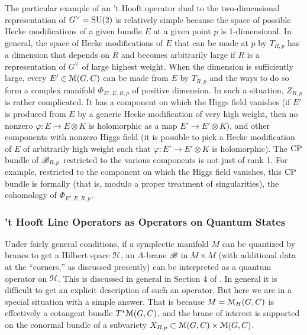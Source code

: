 \documentclass[11pt,a4paper]{article}
\begin{document}
 The particular example of an 't Hooft operator dual to  the two-dimensional representation of $G^\vee={\mathrm{SU}}(2)$ is relatively simple because the space
 of possible Hecke modifications of a given bundle $E$ at a given point $p$ is 1-dimensional.   In general, the space of Hecke modifications of $E$ that
 can be made at $p$ by $T_{R,p}$ has a dimension that depends on $R$ and becomes arbitrarily large if $R$ is a representation of $G^\vee$ of large highest weight.
 When the dimension is sufficiently large, every $E'\in {\mathcal M}(G,C)$ can be made from $E$ by $T_{R,p}$ and the ways to do so form a complex manifold $\Phi_{E',E,R,p}$
 of positive dimension.
 In such a situation, $Z_{R,p}$ is rather complicated.   It has a component on which the Higgs field vanishes (if $E'$ is produced from $E$ by a generic
 Hecke modification of very high weight, then no nonzero $\varphi:E\to E\otimes K$ is holomorphic as a map $E'\to E'\otimes K$), and other
 components with nonzero Higgs field (it is possible to pick a Hecke modification of $E$ of arbitrarily high weight 
 such that $\varphi:E'\to E'\otimes K$ is holomorphic). 
The ${\mathrm{CP}}$ bundle of ${\mathscr B}_{R,p}$ restricted to the various components is not just of rank 1.   For example, restricted to the component on which the
Higgs field vanishes, this ${\mathrm{CP}}$ bundle is formally  (that is,  modulo a proper treatment of singularities), the cohomology of $\Phi_{E',E,R,p}$.
 
\subsubsection{'t Hooft Line Operators as Operators on Quantum States}\label{lineq} 
   
 Under fairly general conditions, if a symplectic manifold $M$ can be quantized by branes to get a Hilbert space ${\mathcal H}$, an $A$-brane ${\mathscr B}$ in $M\times M$ (with
 additional data at the ``corners,'' as discussed presently) can be interpreted
 as a quantum operator on ${\mathcal H}$.  This is discussed in general in Section 4 of \cite{GW}.    In general it is difficult to get an explicit description of such
 an operator.   But here we are in a special situation with a simple answer.   That is because $M={\mathcal M}_H(G,C)$ is effectively a cotangent bundle $T^*{\mathcal M}(G,C)$,
 and the brane of interest is supported on the conormal bundle of a subvariety $X_{R,p}\subset {\mathcal M}(G,C) \times {\mathcal M}(G,C)$.  
 
\end{document}
